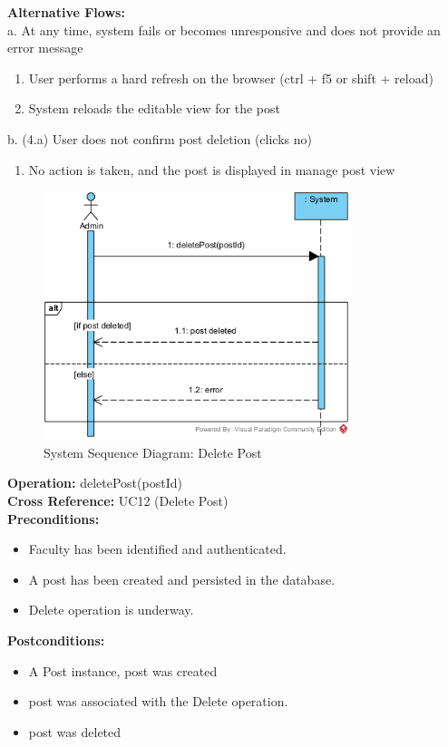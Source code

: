 \textbf{Alternative Flows: } \\
a. At any time, system fails or becomes unresponsive and does not provide an error message
\begin{enumerate}
    \item User performs a hard refresh on the browser (ctrl + f5 or shift + reload)
    \item System reloads the editable view for the post
\end{enumerate}
b. (4.a) User does not confirm post deletion (clicks no)
\begin{enumerate}
    \item No action is taken, and the post is displayed in manage post view
\end{enumerate}

\begin{figure}[H]
    \centering
    \includegraphics[width=0.8\textwidth]{images/SSD-UC12-DeletePost.png}
    \centering
    \caption{System Sequence Diagram: Delete Post}
\end{figure}

\textbf{Operation:} deletePost(postId) \\
\textbf{Cross Reference:} UC12  (Delete Post) \\
\textbf{Preconditions:}
\begin{itemize}
    \item Faculty has been identified and authenticated.
    \item A post has been created and persisted in the database.
    \item Delete operation is underway.
\end{itemize}
\textbf{Postconditions:}
\begin{itemize}
    \item A Post instance, post was created
    \item post was associated with the Delete operation.
    \item post was deleted
\end{itemize}